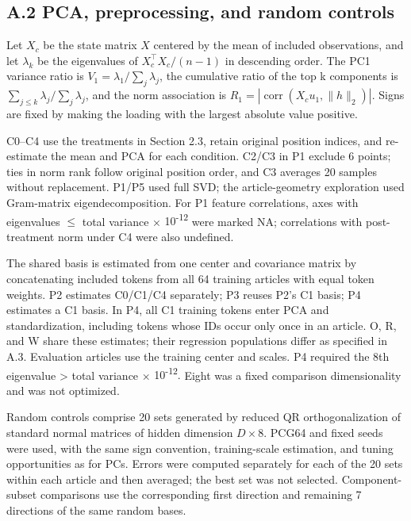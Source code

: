 \FloatBarrier

\subsection{A.2 PCA, preprocessing, and random controls}\label{a.2-pca-preprocessing-and-random-controls}

Let \(X_c\) be the state matrix \(X\) centered by the mean of included observations, and let \(\lambda_k\) be the eigenvalues of \(X_c^\top X_c/(n-1)\) in descending order. The PC1 variance ratio is \(V_1=\lambda_1/\sum_j\lambda_j\), the cumulative ratio of the top k components is \(\sum_{j\le k}\lambda_j/\sum_j\lambda_j\), and the norm association is \(R_1=|\operatorname{corr}(X_cu_1,\|h\|_2)|\). Signs are fixed by making the loading with the largest absolute value positive.

C0--C4 use the treatments in Section 2.3, retain original position indices, and re-estimate the mean and PCA for each condition. C2/C3 in P1 exclude 6 points; ties in norm rank follow original position order, and C3 averages 20 samples without replacement. P1/P5 used full SVD; the article-geometry exploration used Gram-matrix eigendecomposition. For P1 feature correlations, axes with eigenvalues {\(\leq\)} total variance × {10\textsuperscript{-}\textsuperscript{1}\textsuperscript{2}} were marked NA; correlations with post-treatment norm under C4 were also undefined.

The shared basis is estimated from one center and covariance matrix by concatenating included tokens from all 64 training articles with equal token weights. P2 estimates C0/C1/C4 separately; P3 reuses P2's C1 basis; P4 estimates a C1 basis. In P4, all C1 training tokens enter PCA and standardization, including tokens whose IDs occur only once in an article. O, R, and W share these estimates; their regression populations differ as specified in A.3. Evaluation articles use the training center and scales. P4 required the 8th eigenvalue \textgreater{} total variance × {10\textsuperscript{-}\textsuperscript{1}\textsuperscript{2}.} Eight was a fixed comparison dimensionality and was not optimized.

Random controls comprise 20 sets generated by reduced QR orthogonalization of standard normal matrices of hidden dimension \(D\times8\). PCG64 and fixed seeds were used, with the same sign convention, training-scale estimation, and tuning opportunities as for PCs. Errors were computed separately for each of the 20 sets within each article and then averaged; the best set was not selected. Component-subset comparisons use the corresponding first direction and remaining 7 directions of the same random bases.

